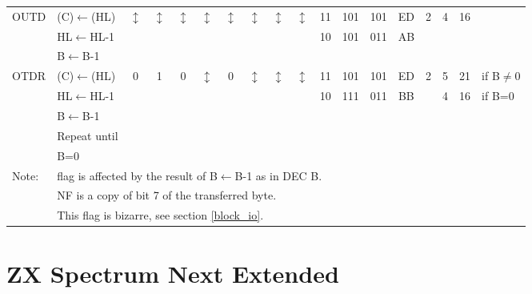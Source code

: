 \documentclass[oneside,a4paper]{book}
\newcommand{\instrt}{\rule{0pt}{2.7ex}}
\newcommand{\instrb}{\rule[-1.7ex]{0pt}{0pt}}
\newcommand{\notet}{\rule{0pt}{2.4ex}}
\newcommand{\noteb}{\rule[-1.3ex]{0pt}{0pt}}
\begin{document}
{\begin{tabular}{llcccccccccccccccl}
		OUTD\instrt & 
			(C)$\leftarrow$(HL) & 
			$\updownarrow$\footnotemark[1] & 
				$\updownarrow$\footnotemark[1] & 
				$\updownarrow$\footnotemark[1] & 
				$\updownarrow$\footnotemark[3] & 
				$\updownarrow$\footnotemark[1] & 
				$\updownarrow$\footnotemark[3] & 
				$\updownarrow$\footnotemark[2] & 
				$\updownarrow$\footnotemark[3] & 
			11 & 101 & 101 & 
			ED & 2 & 
			4 & 16 & \\
			& HL$\leftarrow$HL-1 & \multicolumn{8}{c}{} & 10 & 101 & 011 & AB & \\
			& B$\leftarrow$B-1 & \instrb \\

		OTDR\instrt & 
			(C)$\leftarrow$(HL) & 
			0 & 
				1 & 
				0 & 
				$\updownarrow$\footnotemark[3] & 
				0 & 
				$\updownarrow$\footnotemark[3] & 
				$\updownarrow$\footnotemark[2] & 
				$\updownarrow$\footnotemark[5] & 
			11 & 101 & 101 & 
			ED & 2 & 
			5 & 21 & {if B$\not=$0} \\
			& HL$\leftarrow$HL-1 & \multicolumn{8}{c}{} & 10 & 111 & 011 & BB & & 4 & 16 & {if B=0} \\
			& B$\leftarrow$B-1 \\
			& Repeat until \\
			& B=0 & \instrb \\
			
		\hline

		Note:
			& \multicolumn{17}{l}{\parbox{12cm}{\footnotemark[1] flag is affected by the result of B$\leftarrow$B-1 as in DEC B.}}\notet \\

			& \multicolumn{17}{l}{\parbox{12cm}{\footnotemark[2] NF is a copy of bit 7 of the transferred byte.}} \\

			& \multicolumn{17}{l}{\parbox{12cm}{\footnotemark[3] This flag is bizarre, see section \ref{block_io}.}}\noteb \\
			
		\hline

	\end{tabular}
}


\section{ZX Spectrum Next Extended}
\end{document}

